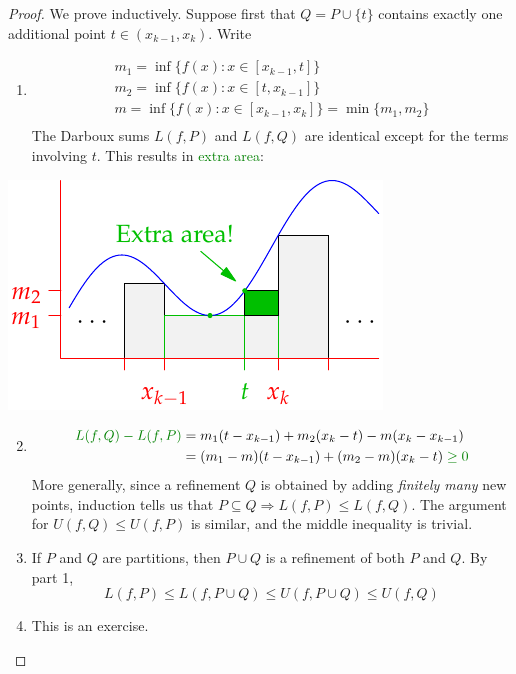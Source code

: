 \begin{proof}
	\exstart We prove inductively. Suppose first that $Q=P\cup\{t\}$ contains exactly one additional point $t\in(x_{k-1},x_k)$. Write\par
	\begin{minipage}[t]{0.6\linewidth}\vspace{-15pt}
		\begin{enumerate}
		  \item[]\begin{gather*}
		  	m_1=\inf\bigl\{f(x):x\in[x_{k-1},t]\bigr\}\\
		  	m_2=\inf\big\{f(x):x\in[t,x_{k-1}]\bigr\}\\
		  	m=\inf\bigl\{f(x):x\in[x_{k-1},x_k]\bigr\}
		  	=\min\{m_1,m_2\}\\[-15pt]
		  \end{gather*}
		  The Darboux sums $L(f,P)$ and $L(f,Q)$ are identical except for the terms involving $t$. This results in \textcolor{Green}{extra area}:
	  \end{enumerate}
	\end{minipage}
	\hfill
	\begin{minipage}[t]{0.36\linewidth}\vspace{-17pt}
		\flushright\includegraphics[scale=0.95]{riemann-sum3}
	\end{minipage}
	\par\vspace{-17pt}
	
	\begin{enumerate}\setcounter{enumi}{1}
	  \item[]\begin{align*}
	  	\textcolor{Green}{L(f,Q)-L(f,P)} 
	  	&=m_1(t-x_{k-1}) +m_2(x_{k}-t) -m(x_k-x_{k-1})\\
	  	&=(m_1-m)(t-x_{k-1}) +(m_2-m)(x_k-t)
	  	\mathrel{\textcolor{Green}{\ge 0}}
	  \end{align*}
	  More generally, since a refinement $Q$ is obtained by adding \emph{finitely many} new points, induction tells us that $P\subseteq Q\Longrightarrow L(f,P)\le L(f,Q)$.\smallbreak
	  The argument for $U(f,Q)\le U(f,P)$ is similar, and the middle inequality is trivial.
	  
	  \item If $P$ and $Q$ are partitions, then $P\cup Q$ is a refinement of both $P$ and $Q$. By part 1,
	  \[
	  	L(f,P)\le L(f,P\cup Q)\le U(f,P\cup Q)\le U(f,Q)\tag{$\ast$}
	  \]
	  
		\item This is an exercise.\qedhere
	\end{enumerate}
\end{proof}


